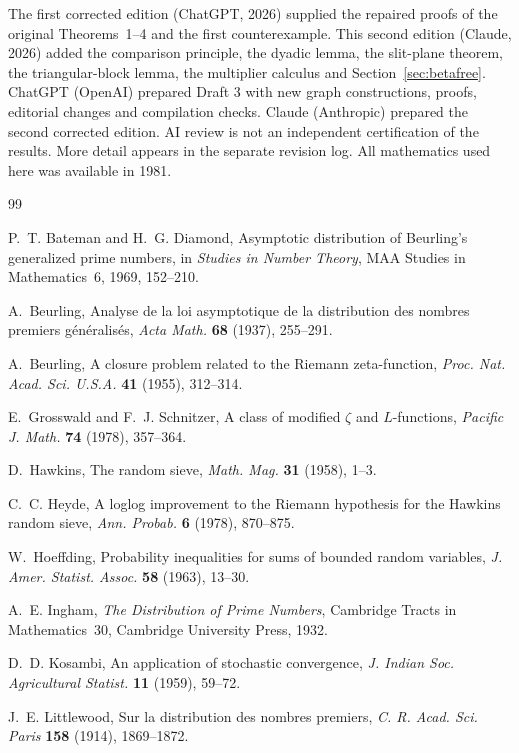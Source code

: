 \documentclass[12pt,letterpaper]{article}
\theoremstyle{definition}
\theoremstyle{remark}
\begin{document}
The first corrected edition (ChatGPT, 2026) supplied the repaired proofs of
the original Theorems~1--4 and the first counterexample. This second
edition (Claude, 2026) added the comparison principle, the dyadic lemma,
the slit-plane theorem, the triangular-block lemma, the multiplier
calculus and Section~\ref{sec:betafree}. ChatGPT (OpenAI) prepared Draft 3 with new graph constructions,
proofs, editorial changes and compilation checks. Claude (Anthropic)
prepared the second corrected edition. AI review is not an independent
certification of the results. More detail appears in the separate
revision log. All mathematics used here was available in 1981.


\begin{thebibliography}{99}

 P.~T. Bateman and H.~G. Diamond, Asymptotic distribution
of Beurling's generalized prime numbers, in \emph{Studies in Number
Theory}, MAA Studies in Mathematics~6, 1969, 152--210.

 A.~Beurling, Analyse de la loi asymptotique de la
distribution des nombres premiers g\'en\'eralis\'es, \emph{Acta Math.}
\textbf{68} (1937), 255--291.

 A.~Beurling, A closure problem related to the Riemann
zeta-function, \emph{Proc. Nat. Acad. Sci. U.S.A.} \textbf{41} (1955),
312--314.

 E.~Grosswald and F.~J. Schnitzer, A class of modified
$\zeta$ and $L$-functions, \emph{Pacific J. Math.} \textbf{74} (1978),
357--364.

 D.~Hawkins, The random sieve, \emph{Math. Mag.}
\textbf{31} (1958), 1--3.

 C.~C. Heyde, A loglog improvement to the Riemann
hypothesis for the Hawkins random sieve, \emph{Ann. Probab.} \textbf{6}
(1978), 870--875.

 W.~Hoeffding, Probability inequalities for sums of
bounded random variables, \emph{J. Amer. Statist. Assoc.} \textbf{58}
(1963), 13--30.

 A.~E. Ingham, \emph{The Distribution of Prime Numbers},
Cambridge Tracts in Mathematics~30, Cambridge University Press, 1932.

 D.~D. Kosambi, An application of stochastic
convergence, \emph{J. Indian Soc. Agricultural Statist.} \textbf{11}
(1959), 59--72.

 J.~E. Littlewood, Sur la distribution des nombres
premiers, \emph{C. R. Acad. Sci. Paris} \textbf{158} (1914), 1869--1872.


\end{thebibliography}
\end{document}
